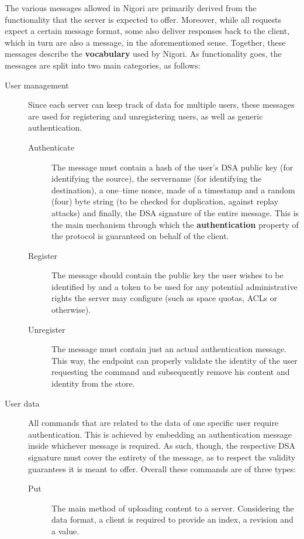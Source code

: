 The various messages allowed in Nigori are primarily derived from the functionality that the server is expected to offer.
Moreover, while all requests expect a certain message format, some also deliver responses back to the client, which in turn are also a message, in the aforementioned sense.
Together, these messages describe the \textbf{vocabulary} used by Nigori.
As functionality goes, the messages are split into two main categories, as follows:
\begin{description}
  \item[User management] Since each server can keep track of data for multiple users, these messages are used for registering and unregistering users, as well as generic authentication.
  \begin{description}
    \item[Authenticate] The message must contain a hash of the user's DSA public key (for identifying the source), the servername (for identifying the destination), a one--time nonce, made of a timestamp and a random (four) byte string (to be checked for duplication, against replay attacks) and finally, the DSA signature of the entire message.
    This is the main mechanism through which the \textbf{authentication} property of the protocol is guaranteed on behalf of the client.

    \item[Register] The message should contain the public key the user wishes to be identified by and a token to be used for any potential administrative rights the server may configure (such as space quotas, ACLs or otherwise).

    \item[Unregister] The message must contain just an actual authentication message.
    This way, the endpoint can properly validate the identity of the user requesting the command and subsequently remove his content and identity from the store.
  \end{description}

  \item[User data] All commands that are related to the data of one specific user require authentication.
  This is achieved by embedding an authentication message inside whichever message is required.
  As such, though, the respective DSA signature must cover the entirety of the message, as to respect the validity guarantees it is meant to offer.
  Overall these commands are of three types:
  \begin{description}
    \item[Put] The main method of uploading content to a server.
    Considering the data format, a client is required to provide an index, a revision and a value.


\end{description}
\end{description}

